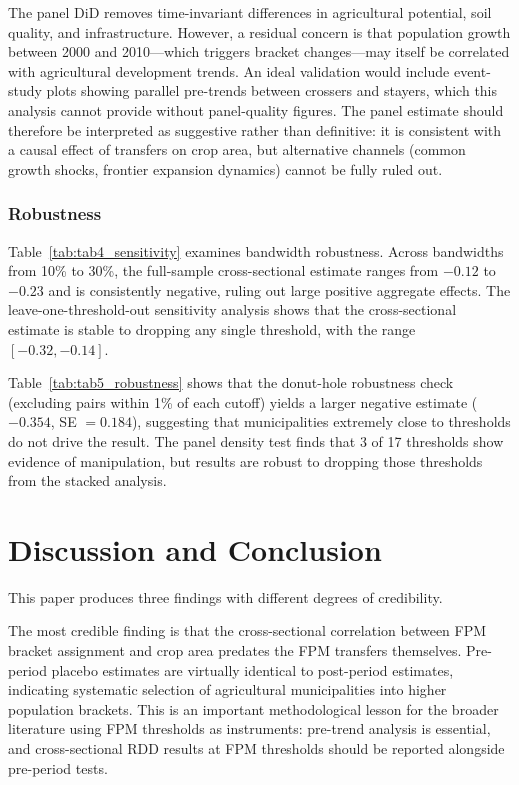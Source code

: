 \documentclass[12pt]{article}
\begin{document}
The panel DiD removes time-invariant differences in agricultural potential, soil quality, and infrastructure. However, a residual concern is that population growth between 2000 and 2010---which triggers bracket changes---may itself be correlated with agricultural development trends. An ideal validation would include event-study plots showing parallel pre-trends between crossers and stayers, which this analysis cannot provide without panel-quality figures. The panel estimate should therefore be interpreted as suggestive rather than definitive: it is consistent with a causal effect of transfers on crop area, but alternative channels (common growth shocks, frontier expansion dynamics) cannot be fully ruled out.

\subsubsection*{Robustness}

Table~\ref{tab:tab4_sensitivity} examines bandwidth robustness. Across bandwidths from 10\% to 30\%, the full-sample cross-sectional estimate ranges from $-0.12$ to $-0.23$ and is consistently negative, ruling out large positive aggregate effects. The leave-one-threshold-out sensitivity analysis shows that the cross-sectional estimate is stable to dropping any single threshold, with the range $[-0.32, -0.14]$.

Table~\ref{tab:tab5_robustness} shows that the donut-hole robustness check (excluding pairs within 1\% of each cutoff) yields a larger negative estimate ($-0.354$, SE $= 0.184$), suggesting that municipalities extremely close to thresholds do not drive the result. The panel density test finds that 3 of 17 thresholds show evidence of manipulation, but results are robust to dropping those thresholds from the stacked analysis.

\section{Discussion and Conclusion}

This paper produces three findings with different degrees of credibility.

The most credible finding is that the cross-sectional correlation between FPM bracket assignment and crop area predates the FPM transfers themselves. Pre-period placebo estimates are virtually identical to post-period estimates, indicating systematic selection of agricultural municipalities into higher population brackets. This is an important methodological lesson for the broader literature using FPM thresholds as instruments: pre-trend analysis is essential, and cross-sectional RDD results at FPM thresholds should be reported alongside pre-period tests.
\end{document}
